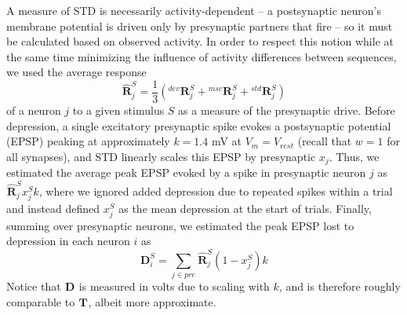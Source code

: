\documentclass[9pt,lineno,onehalfspacing]{elife}
\newcommand{\R}[3][]{{}^{#1}_{}\boldsymbol R^{#2}_{#3}}
\newcommand{\T}[3][]{{}^{#1}_{}\boldsymbol T^{#2}_{#3}}
\newcommand{\D}[3][]{{}^{#1}_{}\boldsymbol D^{#2}_{#3}}
\newcommand{\Rhat}[3][]{{}^{#1}_{}\widehat{\boldsymbol R}^{#2}_{#3}}
\begin{document}
A measure of STD is necessarily activity-dependent -- a postsynaptic neuron's membrane potential is driven only by presynaptic partners that fire -- so it must be calculated based on observed activity. In order to respect this notion while at the same time minimizing the influence of activity differences between sequences, we used the average response
\begin{equation}
    \Rhat{S}{j} = \frac{1}{3} (\R[dev]{S}{j} + \R[msc]{S}{j} + \R[std]{S}{j}) \label{eq:Rhat}
\end{equation}
of a neuron $j$ to a given stimulus $S$ as a measure of the presynaptic drive. Before depression, a single excitatory presynaptic spike evokes a postsynaptic potential (EPSP) peaking at approximately $k = 1.4$ mV at $V_m = V_{rest}$ (recall that $w = 1$ for all synapses), and STD linearly scales this EPSP by presynaptic $x_j$. Thus, we estimated the average peak EPSP evoked by a spike in presynaptic neuron $j$ as $\Rhat{S}{j} x_j^S k$, where we ignored added depression due to repeated spikes within a trial and instead defined $x_j^S$ as the mean depression at the start of trials. Finally, summing over presynaptic neurons, we estimated the peak EPSP lost to depression in each neuron $i$ as
\begin{equation}
    \D{S}{i} = \sum_{j \in pre} \Rhat{S}{j} (1-x_j^S) k \label{eq:D}
\end{equation}
Notice that $\D{}{}$ is measured in volts due to scaling with $k$, and is therefore roughly comparable to $\T{}{}$, albeit more approximate.
\end{document}
